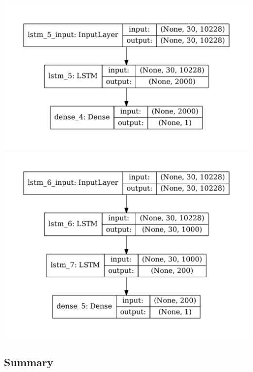 \documentclass[12pt, a4paper]{article}
\begin{document}
\begin{multicols}{2}
{\centering
\includegraphics[width=\columnwidth]{src/stocks/lstm/one_layer}\\
\label{fig:lstm_structure_one}}
{\centering
\includegraphics[width=\columnwidth]{src/stocks/lstm/two_layer}\\
\label{fig:lstm_structure_two}}
\end{multicols}

\subsection{Summary}
\end{document}
